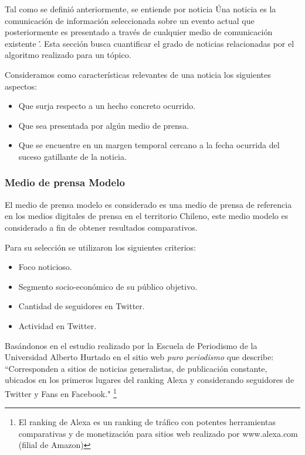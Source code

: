 Tal como se definió anteriormente, se entiende por noticia \' Una noticia es la comunicación de información seleccionada sobre un evento actual que posteriormente es presentado a través de cualquier medio de comunicación existente \'.\cite{Shirky_2008_Herecomes} Esta sección busca cuantificar el grado de noticias relacionadas por el algoritmo realizado para un tópico.

Consideramos como características relevantes de una noticia los siguientes aspectos:

\begin{itemize}
	\item Que surja respecto a un hecho concreto ocurrido.
	\item Que sea presentada por algún medio de prensa.
	\item Que se encuentre en un margen temporal cercano a la fecha ocurrida del suceso gatillante de la noticia.
\end{itemize}

\subsubsection{Medio de prensa Modelo}

El medio de prensa modelo es considerado es una medio de prensa de referencia en los medios digitales de prensa en el territorio Chileno, este medio modelo es considerado a fin de obtener resultados comparativos.

Para su selección se utilizaron los siguientes criterios:

\begin{itemize}
	\item Foco noticioso.
	\item Segmento socio-económico de su público objetivo.
	\item Cantidad de seguidores en Twitter.
	\item Actividad en Twitter.
\end{itemize}

Basándonos en el estudio \cite{puroperiodismoMenciones} realizado por la Escuela de Periodismo de la Universidad Alberto Hurtado en el sitio web \emph{puro periodismo} que describe: ``Corresponden a sitios de noticias generalistas, de publicación constante, ubicados en los primeros lugares del ranking Alexa y considerando seguidores de Twitter y Fans en Facebook."  \footnote{El ranking de Alexa es un ranking de tráfico con potentes herramientas comparativas y de monetización para sitios web realizado por www.alexa.com (filial de Amazon)}

